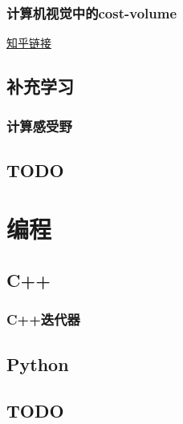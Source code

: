 \documentclass[cn,hazy,black,normal]{elegantnote}
\numberwithin{equation}{section}
\numberwithin{figure}{section}
\begin{document}
			\subsubsection{计算机视觉中的cost-volume}
				\href{https://www.zhihu.com/question/366970399}{知乎链接}	
		
		
		
		
		
		
		\subsection{补充学习}
			\subsubsection{计算感受野}
		
		
		
		\subsection{TODO}
		
	\section{编程}
		\subsection{C++}	
			\subsubsection{C++迭代器}
				
		
		\subsection{Python}
		
		\subsection{TODO}
			
			
			
			
			
			
		
\end{document}
